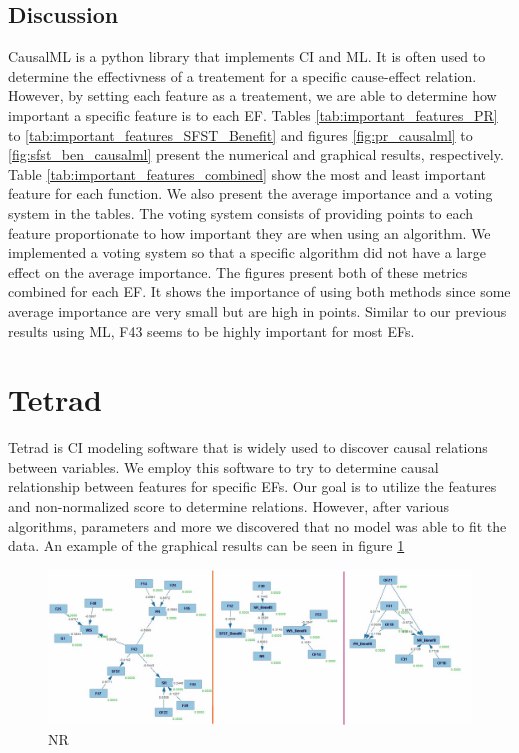 \documentclass[12pt,letterpaper]{article}
\begin{document}
\subsection{Discussion}
CausalML is a python library that implements CI and \ac{ML}.
It is often used to determine the effectivness of a treatement for a specific cause-effect relation.
However, by setting each feature as a treatement, we are able to determine how important a specific feature is to each \ac{EF}.
Tables \ref{tab:important_features_PR} to \ref{tab:important_features_SFST_Benefit} and
figures \ref{fig:pr_causalml} to \ref{fig:sfst_ben_causalml} present the numerical and graphical results, respectively.
Table \ref{tab:important_features_combined} show the most and least important feature for each function.
We also present the average importance and a voting system in the tables.
The voting system consists of providing points to each feature proportionate to how important they are when using an algorithm.
We implemented a voting system so that a specific algorithm did not have a large effect on the average importance.
The figures present both of these metrics combined for each EF.
It shows the importance of using both methods since some average importance are very small but are high in points.
Similar to our previous results using \ac{ML}, F43 seems to be highly important for most \ac{EF}s.


\clearpage
\section{Tetrad}
Tetrad is \ac{CI} modeling software that is widely used to discover causal relations between variables.
We employ this software to try to determine causal relationship between features for specific \ac{EF}s.
Our goal is to utilize the features and non-normalized score to determine relations.
However, after various algorithms, parameters and more we discovered that no model was able to fit the data.
An example of the graphical results can be seen in figure \ref{fig:tetrad}

\begin{figure}[b]
    \centering
    \includegraphics[width=0.95\linewidth]{tetrad/ex1.jpg}
    \caption{NR}
    \label{fig:tetrad}
\end{figure}
\end{document}
